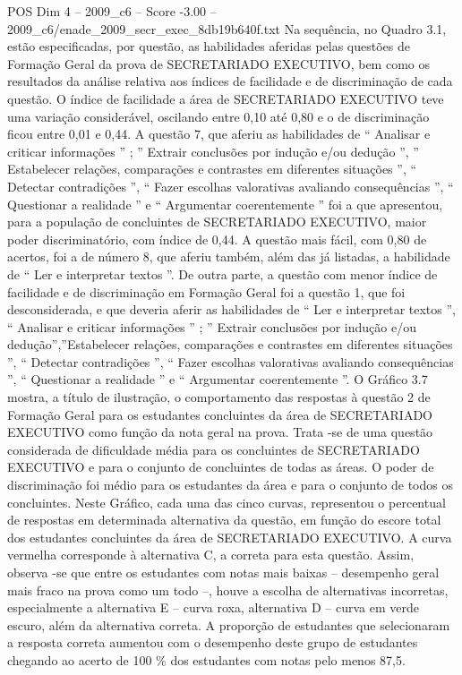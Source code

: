 \begin{textsample}{POS Dim 4 – 2009\_c6 – Score -3.00 – 2009\_c6/enade\_2009\_secr\_exec\_8db19b640f.txt}
Na sequência, no Quadro 3.1, estão especificadas, por questão, as habilidades aferidas pelas questões de Formação Geral da prova de SECRETARIADO EXECUTIVO, bem como os resultados da análise relativa aos índices de facilidade e de discriminação de cada questão.
O índice de facilidade a área de SECRETARIADO EXECUTIVO teve uma variação considerável, oscilando entre 0,10 até 0,80 e o de discriminação ficou entre 0,01 e 0,44.
A questão 7, que aferiu as habilidades de “ Analisar e criticar informações ” ; ” Extrair conclusões por indução e/ou dedução ”, ” Estabelecer relações, comparações e contrastes em diferentes situações ”, “ Detectar contradições ”, “ Fazer escolhas valorativas avaliando consequências ”, “ Questionar a realidade ” e “ Argumentar coerentemente ” foi a que apresentou, para a população de concluintes de SECRETARIADO EXECUTIVO, maior poder discriminatório, com índice de 0,44.
A questão mais fácil, com 0,80 de acertos, foi a de número 8, que aferiu também, além das já listadas, a habilidade de “ Ler e interpretar textos ”.
De outra parte, a questão com menor índice de facilidade e de discriminação em Formação Geral foi a questão 1, que foi desconsiderada, e que deveria aferir as habilidades de “ Ler e interpretar textos ”, “ Analisar e criticar informações ” ; ” Extrair conclusões por indução e/ou dedução”,”Estabelecer relações, comparações e contrastes em diferentes situações ”, “ Detectar contradições ”, “ Fazer escolhas valorativas avaliando consequências ”, “ Questionar a realidade ” e “ Argumentar coerentemente ”.
O Gráfico 3.7 mostra, a título de ilustração, o comportamento das respostas à questão 2 de Formação Geral para os estudantes concluintes da área de SECRETARIADO EXECUTIVO como função da nota geral na prova.
Trata -se de uma questão considerada de dificuldade média para os concluintes de SECRETARIADO EXECUTIVO e para o conjunto de concluintes de todas as áreas.
O poder de discriminação foi médio para os estudantes da área e para o conjunto de todos os concluintes.
Neste Gráfico, cada uma das cinco curvas, representou o percentual de respostas em determinada alternativa da questão, em função do escore total dos estudantes concluintes da área de SECRETARIADO EXECUTIVO.
A curva vermelha corresponde à alternativa C, a correta para esta questão.
Assim, observa -se que entre os estudantes com notas mais baixas – desempenho geral mais fraco na prova como um todo –, houve a escolha de alternativas incorretas, especialmente a alternativa E – curva roxa, alternativa D – curva em verde escuro, além da alternativa correta.
A proporção de estudantes que selecionaram a resposta correta aumentou com o desempenho deste grupo de estudantes chegando ao acerto de 100 \% dos estudantes com notas pelo menos 87,5.

\end{textsample}
